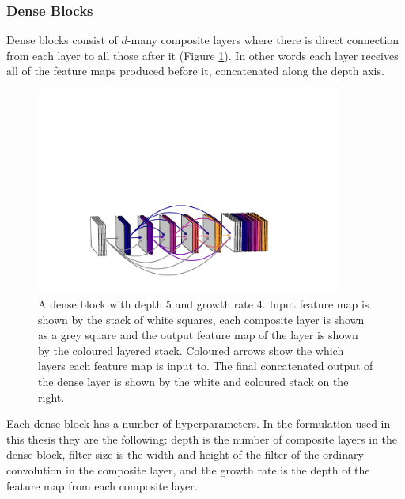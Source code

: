 \subsubsection{Dense Blocks}
Dense blocks consist of $d$-many composite layers where there is direct connection from each layer to all those after it (Figure \ref{fig:machine_learning:dense_block}). 
In other words each layer receives all of the feature maps produced before it, concatenated along the depth axis. 
\begin{figure}[h!]
    \includegraphics[width=0.90\textwidth]{figures/machine_learning/dense_block.pdf}
    \caption{A dense block with depth 5 and growth rate 4. Input feature map is shown by the stack of white squares, each composite layer is shown as a grey square and the output feature map of the layer is shown by the coloured layered stack. Coloured arrows show the which layers each feature map is input to. The final concatenated output of the dense layer is shown by the white and coloured stack on the right.}
        \label{fig:machine_learning:dense_block}
\end{figure}
Each dense block has a number of hyperparameters. In the formulation used in this thesis they are the following: depth is the number of composite layers in the dense block, filter size is the width and height of the filter of the ordinary convolution in the composite layer, and the growth rate is the depth of the feature map from each composite layer.


